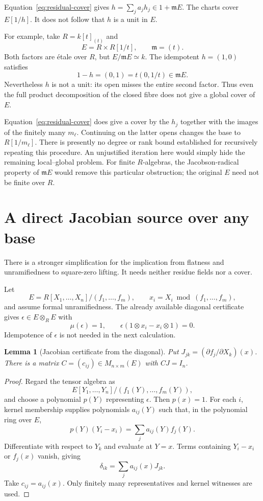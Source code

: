 \documentclass[11pt]{article}
\newtheorem{lemma}[theorem]{Lemma}
\newcommand{\m}{\mathfrak m}
\begin{document}
Equation~\eqref{eq:residual-cover} gives $h=\sum_j a_jh_j\in1+\m E$.
The charts cover $E[1/h]$. It does not follow that $h$ is a unit in $E$.

For example, take $R=k[t]_{(t)}$ and
\[
              E=R\times R[1/t],\qquad \m=(t).
\]
Both factors are \'etale over $R$, but $E/\m E\simeq k$. The idempotent
$h=(1,0)$ satisfies
\[
              1-h=(0,1)=t(0,1/t)\in\m E.
\]
Nevertheless $h$ is not a unit: its open misses the entire second factor.
Thus even the full product decomposition of the closed fibre does not
give a global cover of $E$.

Equation~\eqref{eq:residual-cover} does give a cover by the $h_j$ together
with the images of the finitely many $m_\ell$. Continuing on the latter
opens changes the base to $R[1/m_\ell]$. There is presently no degree or
rank bound established for recursively repeating this procedure. An
unjustified iteration here would simply hide the remaining local--global
problem. For finite $R$-algebras, the Jacobson-radical property of $\m E$
would remove this particular obstruction; the original $E$ need not be
finite over $R$.

\section{A direct Jacobian source over any base}

There is a stronger simplification for the implication from flatness and
unramifiedness to square-zero lifting. It needs neither residue fields
nor a cover.

Let
\[
       E=R[X_1,\ldots,X_n]/(f_1,\ldots,f_m),
       \qquad x_i=X_i\bmod(f_1,\ldots,f_m),
\]
and assume formal unramifiedness. The already available diagonal
certificate gives $\epsilon\in E\otimes_R E$ with
\[
       \mu(\epsilon)=1,\qquad
       \epsilon(1\otimes x_i-x_i\otimes1)=0.
\]
Idempotence of $\epsilon$ is not needed in the next calculation.

\begin{lemma}[Jacobian certificate from the diagonal]\label{lem:jac}
Put $J_{jk}=(\partial f_j/\partial X_k)(x)$. There is a matrix
$C=(c_{ij})\in M_{n\times m}(E)$ with $CJ=I_n$.
\end{lemma}
\begin{proof}
Regard the tensor algebra as
\[
       E[Y_1,\ldots,Y_n]/(f_1(Y),\ldots,f_m(Y)),
\]
and choose a polynomial $p(Y)$ representing $\epsilon$. Then $p(x)=1$.
For each $i$, kernel membership supplies polynomials $a_{ij}(Y)$ such
that, in the polynomial ring over $E$,
\[
       p(Y)(Y_i-x_i)=\sum_j a_{ij}(Y)f_j(Y).
\]
Differentiate with respect to $Y_k$ and evaluate at $Y=x$. Terms
containing $Y_i-x_i$ or $f_j(x)$ vanish, giving
\[
              \delta_{ik}=\sum_j a_{ij}(x)J_{jk}.
\]
Take $c_{ij}=a_{ij}(x)$. Only finitely many representatives and kernel
witnesses are used.
\end{proof}
\end{document}
